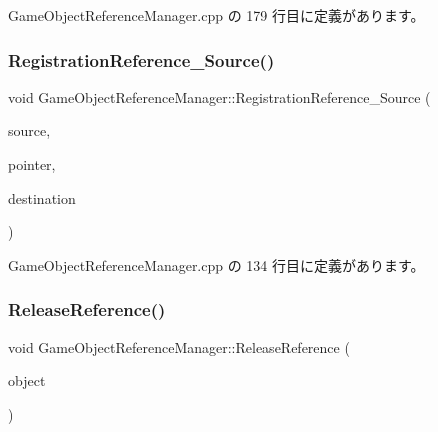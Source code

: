  Game\+Object\+Reference\+Manager.\+cpp の 179 行目に定義があります。

\mbox{\label{class_game_object_reference_manager_aa4ca837b7d576db6b11745b2f8530b4d}} 
\subsubsection{\texorpdfstring{Registration\+Reference\+\_\+\+Source()}{RegistrationReference\_Source()}}
{\footnotesize\ttfamily void Game\+Object\+Reference\+Manager\+::\+Registration\+Reference\+\_\+\+Source (\begin{DoxyParamCaption}\item[{\mbox{\hyperlink{class_game_object_base}{Game\+Object\+Base}} $\ast$}]{source,  }\item[{void $\ast$}]{pointer,  }\item[{\mbox{\hyperlink{class_game_object_base}{Game\+Object\+Base}} $\ast$}]{destination }\end{DoxyParamCaption})\hspace{0.3cm}{\ttfamily [private]}}



 Game\+Object\+Reference\+Manager.\+cpp の 134 行目に定義があります。

\mbox{\label{class_game_object_reference_manager_ac7d117427de3052f893228408a3de5d7}} 
\subsubsection{\texorpdfstring{Release\+Reference()}{ReleaseReference()}}
{\footnotesize\ttfamily void Game\+Object\+Reference\+Manager\+::\+Release\+Reference (\begin{DoxyParamCaption}\item[{\mbox{\hyperlink{class_game_object_base}{Game\+Object\+Base}} $\ast$}]{object }\end{DoxyParamCaption})}



